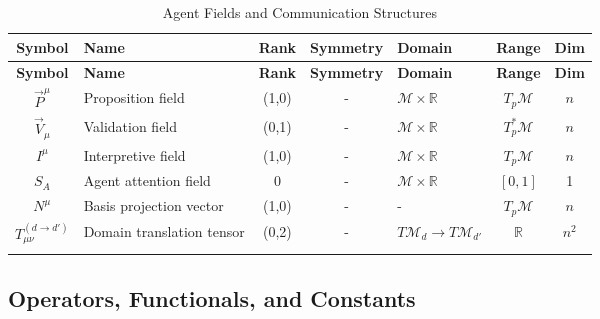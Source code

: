 {\small
\renewcommand{\arraystretch}{1.1}
\begin{longtable}{|c|p{5.5cm}|c|c|p{1.8cm}|c|c|}
\hline
\textbf{Symbol} & \textbf{Name} & \textbf{Rank} & \textbf{Symmetry} & \textbf{Domain} & \textbf{Range} & \textbf{Dim} \\
\hline
\endfirsthead
\hline
\textbf{Symbol} & \textbf{Name} & \textbf{Rank} & \textbf{Symmetry} & \textbf{Domain} & \textbf{Range} & \textbf{Dim} \\
\hline
\endhead
\(\vec{P}^\mu\) & Proposition field & (1,0) & - & \(\mathcal{M} \times \mathbb{R}\) & \(T_p\mathcal{M}\) & \(n\) \\
\hline
\(\vec{V}_\mu\) & Validation field & (0,1) & - & \(\mathcal{M} \times \mathbb{R}\) & \(T_p^*\mathcal{M}\) & \(n\) \\
\hline
\(I^\mu\) & Interpretive field & (1,0) & - & \(\mathcal{M} \times \mathbb{R}\) & \(T_p\mathcal{M}\) & \(n\) \\
\hline
\(S_A\) & Agent attention field & 0 & - & \(\mathcal{M} \times \mathbb{R}\) & \([0,1]\) & 1 \\
\hline
\(N^\mu\) & Basis projection vector & (1,0) & - & - & \(T_p\mathcal{M}\) & \(n\) \\
\hline
\(T_{\mu\nu}^{(d \to d')}\) & Domain translation tensor & (0,2) & - & \(T\mathcal{M}_d \to T\mathcal{M}_{d'}\) & \(\mathbb{R}\) & \(n^2\) \\
\hline
\caption{Agent Fields and Communication Structures}
\end{longtable}
}


\subsection{Operators, Functionals, and Constants}
\label{2.2.7:operators_functionals_and_constants}


